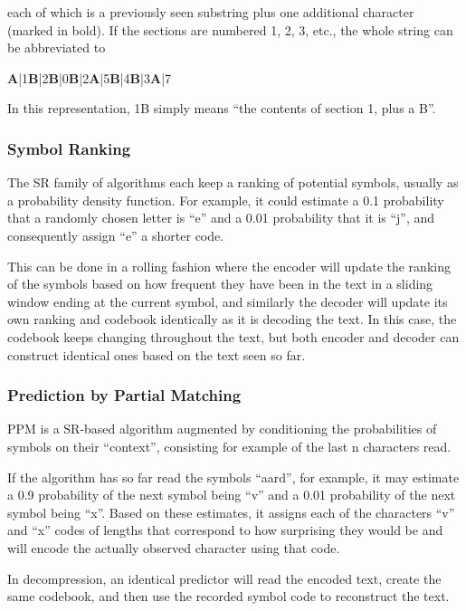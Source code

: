 each of which is a previously seen substring plus one additional character (marked in bold). If the sections are numbered 1, 2, 3, etc., the whole string can be abbreviated to

\begin{center}
\textbf{A}|1\textbf{B}|2\textbf{B}|0\textbf{B}|2\textbf{A}|5\textbf{B}|4\textbf{B}|3\textbf{A}|7
\end{center}

In this representation, 1B simply means “the contents of section 1, plus a B”.


\subsubsection{Symbol Ranking}
The SR family of algorithms each keep a ranking of potential symbols, usually as a probability density function. For example, it could estimate a 0.1 probability that a randomly chosen letter is “e” and a 0.01 probability that it is “j”, and consequently assign “e” a shorter code.

This can be done in a rolling fashion where the encoder will update the ranking of the symbols based on how frequent they have been in the text in a sliding window ending at the current symbol, and similarly the decoder will update its own ranking and codebook identically as it is decoding the text. In this case, the codebook keeps changing throughout the text, but both encoder and decoder can construct identical ones based on the text seen so far. 

\subsubsection{Prediction by Partial Matching}
PPM is a SR-based algorithm augmented by conditioning the probabilities of symbols on their “context”, consisting for example of the last n characters read.

If the algorithm has so far read the symbols “aard”, for example, it may estimate a 0.9 probability of the next symbol being “v” and a 0.01 probability of the next symbol being “x”. Based on these estimates, it assigns each of the characters “v” and “x” codes of lengths that correspond to how surprising they would be and will encode the actually observed character using that code.

In decompression, an identical predictor will read the encoded text, create the same codebook, and then use the recorded symbol code to reconstruct the text. \autocite{Fenwick1998}

